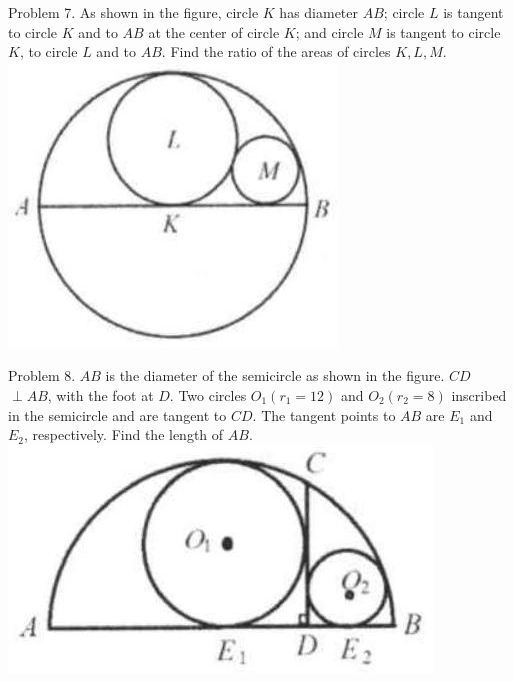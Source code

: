 \documentclass[10pt]{article}
\begin{document}
Problem 7. As shown in the figure, circle \(K\) has diameter \(A B\); circle \(L\) is tangent to circle \(K\) and to \(A B\) at the center of circle \(K\); and circle \(M\) is tangent to circle \(K\), to circle \(L\) and to \(A B\). Find the ratio of the areas of circles \(K, L, M\).\\
\includegraphics[max width=\textwidth, center]{2025_04_17_97bc1f7e44d93c271a88g-185(1)}

Problem 8. \(A B\) is the diameter of the semicircle as shown in the figure. \(C D\) \(\perp A B\), with the foot at \(D\). Two circles \(O_{1}\left(r_{1}=12\right)\) and \(O_{2}\left(r_{2}=8\right)\) inscribed in the semicircle and are tangent to \(C D\). The tangent points to \(A B\) are \(E_{1}\) and \(E_{2}\), respectively. Find the length of \(A B\).\\
\includegraphics[max width=\textwidth, center]{2025_04_17_97bc1f7e44d93c271a88g-185(3)}
\end{document}
